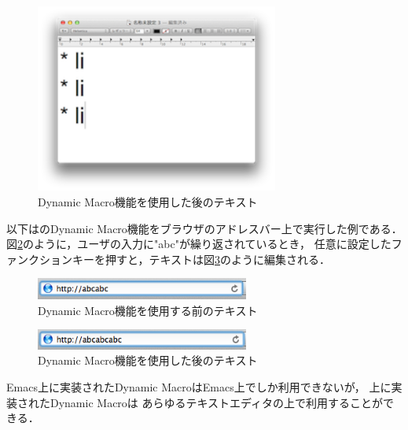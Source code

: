 \begin{figure}[H]
\centerline{\includegraphics[width=80mm,bb=0 0 360 220]{figures/dynamic2.png}}
\caption{Dynamic Macro機能を使用した後のテキスト}
\label{dynamic2}
\end{figure}


以下は{\system}のDynamic Macro機能をブラウザのアドレスバー上で実行した例である．
図\ref{dynamic3}のように，ユーザの入力に"abc"が繰り返されているとき，
任意に設定したファンクションキーを押すと，テキストは図\ref{dynamic4}のように編集される．

\begin{figure}[H]
\centerline{\includegraphics[width=70mm,bb=0 0 360 50]{figures/dynamic3.png}}
\caption{Dynamic Macro機能を使用する前のテキスト}
\label{dynamic3}
\end{figure}

\begin{figure}[H]
\centerline{\includegraphics[width=70mm,bb=0 0 360 50]{figures/dynamic4.png}}
\caption{Dynamic Macro機能を使用した後のテキスト}
\label{dynamic4}
\end{figure}

Emacs上に実装されたDynamic MacroはEmacs上でしか利用できないが，
{\system}上に実装されたDynamic Macroは
あらゆるテキストエディタの上で利用することができる．


